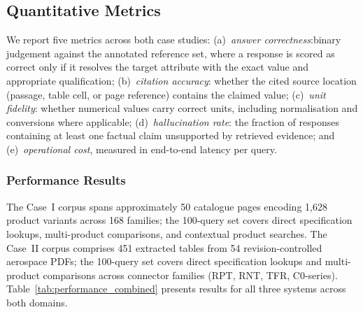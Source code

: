 \documentclass[largeformat]{interact}
\begin{document}
\subsection{Quantitative Metrics}
\label{subsec:quantitative_metrics}
We report five metrics across both case studies:
(a)~\textit{answer correctness}:binary judgement against the annotated reference set, where a response is scored as correct only if it resolves the target attribute with the exact value and appropriate qualification;
(b)~\textit{citation accuracy}: whether the cited source location (passage, table cell, or page reference) contains the claimed value;
(c)~\textit{unit fidelity}: whether numerical values carry correct units, including normalisation and conversions where applicable;
(d)~\textit{hallucination rate}: the fraction of responses containing at least one factual claim unsupported by retrieved evidence; and
(e)~\textit{operational cost}, measured in end-to-end latency per query.

\subsubsection{Performance Results}
\label{subsubsec:performance_results}
The Case~I corpus spans approximately 50 catalogue pages encoding 1{,}628 product variants across 168 families; the 100-query set covers direct specification lookups, multi-product comparisons, and contextual product searches. The Case~II corpus comprises 451 extracted tables from 54 revision-controlled aerospace PDFs; the 100-query set covers direct specification lookups and multi-product comparisons across connector families (RPT, RNT, TFR, C0-series). Table~\ref{tab:performance_combined} presents results for all three systems across both domains.
\end{document}
